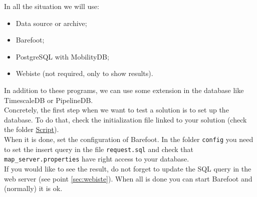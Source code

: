 \documentclass[a4paper,12pt]{article}
\begin{document}
    In all the situation we will use:
    \begin{itemize}
        \item Data source or archive;
        \item Barefoot;
        \item PostgreSQL with MobilityDB;
        \item Webiste (not required, only to show results).
    \end{itemize}
    In addition to these programs, we can use some extension in the database like TimescaleDB or PipelineDB.\\
    
    Concretely, the first step when we want to test a solution is to set up the database. To do that, check the initialization file linked to your solution (check the folder \href{https://github.com/detobel36/MobilityDBComparison/tree/master/Script}{Script}).\\
    When it is done, set the configuration of Barefoot. In the folder \verb|config| you need to set the insert query in the file \verb|request.sql| and check that \verb|map_server.properties| have right access to your database.\\
    
    If you would like to see the result, do not forget to update the SQL query in the web server (see point \ref{sec:webiste}). When all is done you can start Barefoot and (normally) it is ok.
    
\end{document}
